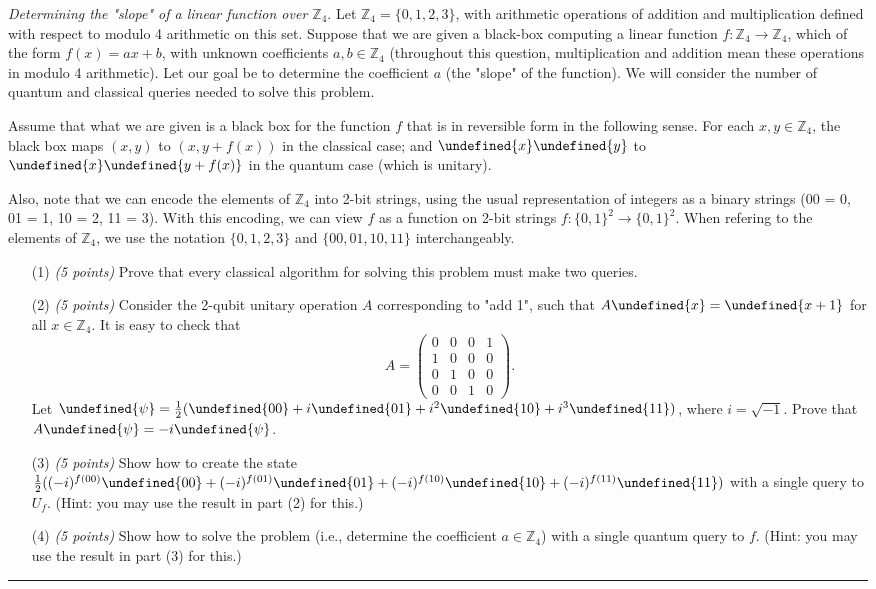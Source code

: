 \documentclass{article}
\newcommand{\shortbar}{\begin{center}\rule{5ex}{0.1pt}\end{center}}
\theoremstyle{plain}
\theoremstyle{definition}
\theoremstyle{remark}
\newenvironment{problem}[1]{\medskip\noindent{\bf Problem #1.~}}{\shortbar}
\newcommand{\points}[1]{\textit{(#1 points)}}
\let\ket\undefined
\begin{document}
\begin{problem}{2}
 \emph{Determining the "slope" of a linear function over $\mathbb{Z}_4$}. 
Let $\mathbb{Z}_4 = \{0, 1, 2, 3\}$, with arithmetic operations of addition and multiplication defined with respect to modulo 4 arithmetic on this set. Suppose that we are given a black-box computing a linear function $f: \mathbb{Z}_4 \rightarrow \mathbb{Z}_4$, which of the form $f(x) = ax+b$, with unknown coefficients $a, b \in \mathbb{Z}_4$ (throughout this question, multiplication and addition mean these operations in modulo 4 arithmetic). Let our goal be to determine the coefficient $a$ (the "slope" of the function). We will consider the number of quantum and classical queries needed to solve this problem.

Assume that what we are given is a black box for the function $f$ that is in reversible form in the following sense. For each $x,y \in \mathbb{Z}_4$, the black box maps $(x,y)$ to $(x,y + f(x))$ in the classical case; and $\ket{x}\ket{y}$ to $\ket{x} \ket{y + f (x)}$ in the quantum case (which is unitary).

Also, note that we can encode the elements of $\mathbb{Z}_4$ into 2-bit strings, using the usual representation of integers as a binary strings (00 = 0, 01 = 1, 10 = 2, 11 = 3). With this encoding, we can view $f$ as a function on 2-bit strings $f : \{0,1\}^2 \rightarrow \{0, 1\}^2$. When refering to the elements of $\mathbb{Z}_4$, we use the notation $\{0, 1, 2, 3\}$ and $\{00, 01, 10, 11\}$ interchangeably.

\begin{itemize}
  \item[(1)] \points{5} Prove that every classical algorithm for solving this problem must make two queries.
  \item[(2)] \points{5} Consider the 2-qubit unitary operation $A$ corresponding to "add 1", such that $A\ket{x} =
\ket{x+1}$ for all $x \in \mathbb{Z}_4$. It is easy to check that 
   \[ A= \left( \begin{array}{cccc}
0 & 0 & 0 & 1\\
1 & 0 & 0 & 0 \\
0 & 1 & 0 & 0\\
0 & 0 & 1 & 0 \end{array} \right).\] 
Let $\ket{\psi} =\frac{1}{2} (\ket{00} + i \ket{01}+ i^2 \ket{10} +i^3 \ket{11})$, where $i=\sqrt{-1}$. Prove that $A\ket{\psi}=-i\ket{\psi}$.   
  \item[(3)] \points{5} Show how to create the state $\frac{1}{2}((-i)^{f(00)}\ket{00}+(-i)^{f(01)}\ket{01}+(-i)^{f(10)}\ket{10}+(-i)^{f(11)}\ket{11})$ with a single query to $U_f$. (Hint: you may use the result in part (2) for this.)
  \item[(4)] \points{5} Show how to solve the problem (i.e., determine the coefficient $a \in \mathbb{Z}_4$) with a single
quantum query to $f$. (Hint: you may use the result in part (3) for this.)
\end{itemize}
\end{problem}
\end{document}
